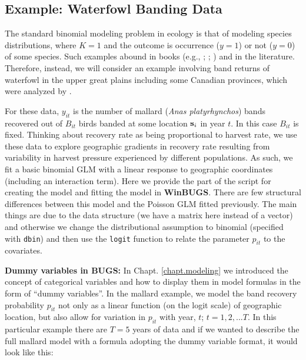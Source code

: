 {{\subsection{ Example: Waterfowl Banding Data}

The standard binomial modeling problem in ecology is that of 
modeling species distributions, 
 where $K=1$ and the outcome is occurrence ($y=1$) or not
($y=0$) of some species. Such examples abound in books (e.g.,
\citet[][ch. 3]{royle_dorazio:2008}; \citet[][ch. 21]{kery:2010};
\citet[][ch. 13]{kery_schaub:2011}) and in the literature.
Therefore, instead, we will
consider an example involving band returns of waterfowl in the upper great plains including some Canadian provinces, which were
analyzed by \citet{royle_dubovsky:2001}.

For these data, $y_{it}$ is the number of mallard ({\it Anas platyrhynchos}) bands recovered out
of $B_{it}$ birds banded at some location ${\bf s}_{i}$ in year $t$. In this case $B_{it}$ is
fixed. Thinking about recovery rate as being proportional to harvest
rate, we use these data to explore geographic gradients in recovery rate
resulting from variability in harvest pressure experienced by different
populations. 
As such, we fit a
basic binomial GLM with a linear response to geographic coordinates
(including an interaction term). 
Here we
 provide the part of the script for creating the model and fitting the
 model in
{\bf WinBUGS}.
There are few structural differences between this model and the
Poisson GLM fitted previously. The main things are due to the data
structure (we have a matrix here instead of a vector) and otherwise we
change the  distributional assumption to binomial (specified with
\mbox{\tt dbin}) and then use the \mbox{\tt logit} function to relate
the parameter $p_{it}$ to the covariates.  

{\flushleft \bf Dummy variables in BUGS: } In
Chapt. \ref{chapt.modeling} we introduced the concept of categorical
variables and how to display them in model formulas in the form of
``dummy variables''. In the mallard example, we model the band
recovery probability $p_{it}$ not only as a linear function (on the logit
scale) of geographic location, but also allow for variation in $p_{it}$
with year, $t$; $t=1,2,...T$. In this particular example there are
$T=5$ years of data and if we wanted to describe the full mallard
model with a formula adopting the dummy variable format, it would look
like this:

}}
